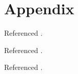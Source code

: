 \documentclass[11pt, letterpaper]{article} %
\begin{document}
\clearpage
\section*{Appendix}
\renewcommand{\thelstlisting}{A.\arabic{lstlisting}}

Referenced \cite{cppreference-ignore}.


Referenced \cite{cppreference-sv-literals}.

Referenced \cite{cppreference-optional,so-std-copy-overlap,cppreference-stdexcept}.



\clearpage



\end{document}
